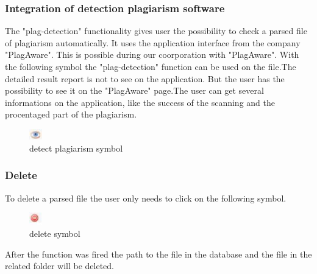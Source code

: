 \subsubsection{Integration of detection plagiarism software}
The "plag-detection" functionality gives user the possibility to check a parsed file of plagiarism automatically. It uses the application interface from the company "PlagAware". This is possible during our coorporation with "PlagAware".
With the following symbol the "plag-detection" function can be used on the file.The detailed result report is not to see on the application. But the user has the possibility to see it on the "PlagAware" page.The user can get several informations on the application, like the success of the scanning and the procentaged part of the plagiarism.
\begin{figure}[!ht]
  \centering
    \includegraphics[width=0.05\textwidth]{images/basic_functionalities/plagdetection_symbol.jpg}
  \caption{detect plagiarism symbol}
  \label{detect plagiarism symbol}
\end{figure}
\subsubsection{Delete}
To delete a parsed file the user only needs to click on the following symbol.
\begin{figure}[!ht]
  \centering
    \includegraphics[width=0.05\textwidth]{images/basic_functionalities/delete_symbol.jpg}
  \caption{delete symbol}
  \label{fig:delete symbol}
\end{figure}
After the function was fired the path to the file in the database and the file in the related folder will be deleted.
